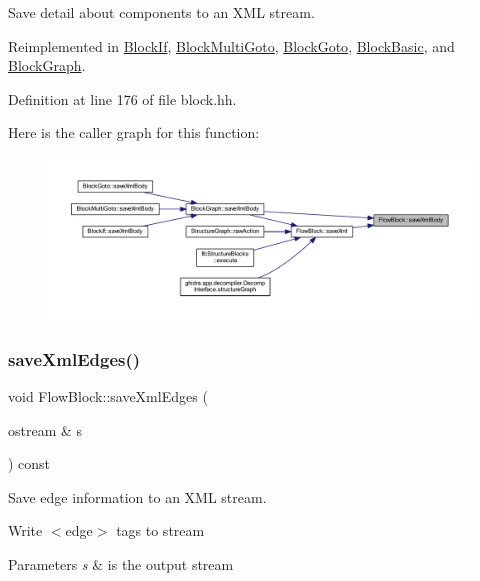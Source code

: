 Save detail about components to an X\+ML stream. 



Reimplemented in \mbox{\hyperlink{class_block_if_ae2abef245decb84faf212ce156389d9e}{Block\+If}}, \mbox{\hyperlink{class_block_multi_goto_ac537bd161b597061aeca88bcc01e260c}{Block\+Multi\+Goto}}, \mbox{\hyperlink{class_block_goto_a4210ef977a85a74b9923e405057b093b}{Block\+Goto}}, \mbox{\hyperlink{class_block_basic_aec6c3cb9b136472b012a6d39e516efaa}{Block\+Basic}}, and \mbox{\hyperlink{class_block_graph_a881076195239ce5c2e5c865f22714d03}{Block\+Graph}}.



Definition at line 176 of file block.\+hh.

Here is the caller graph for this function\+:
\nopagebreak
\begin{figure}[H]
\begin{center}
\leavevmode
\includegraphics[width=350pt]{class_flow_block_a05d5939fe8f00edba7320799bf3f177b_icgraph}
\end{center}
\end{figure}
\mbox{\label{class_flow_block_a5b6c4638bc1ca5fa47c33fe2ca0e1696}} 
\subsubsection{\texorpdfstring{saveXmlEdges()}{saveXmlEdges()}}
{\footnotesize\ttfamily void Flow\+Block\+::save\+Xml\+Edges (\begin{DoxyParamCaption}\item[{ostream \&}]{s }\end{DoxyParamCaption}) const}



Save edge information to an X\+ML stream. 

Write $<$edge$>$ tags to stream 
\begin{DoxyParams}{Parameters}
{\em s} & is the output stream \\
\hline
\end{DoxyParams}


